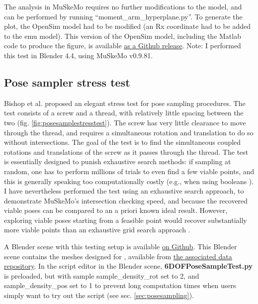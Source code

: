 \documentclass{article}
\begin{document}
The analysis in MuSkeMo requires no further modifications to the model, and can be performed by running ``moment\_arm\_hyperplane.py''. To generate the plot, the OpenSim model had to be modified (an Rx coordinate had to be added to the emu model). This version of the OpenSim model, including the Matlab code to produce the figure, is available \href{https://github.com/PashavanBijlert/MuSkeMo/releases/tag/v0.x-momentarmhyperplane}{as a Github release}. Note: I performed this test in Blender 4.4, using MuSkeMo v0.9.81.



\subsection{Pose sampler stress test}
\label{sec:posesampletest}

Bishop et al. \cite{bishopIntelligentSamplingHighdimensional2023} proposed an elegant stress test for pose sampling procedures. The test consists of a screw and a thread, with relatively little spacing between the two (fig. \ref{fig:posesamplestresstest}). The screw has very little clearance to move through the thread, and requires a simultaneous rotation and translation to do so without intersections. The goal of the test is to find the simultaneous coupled rotations and translations of the screw as it passes through the thread.
The test is essentially designed to punish exhaustive search methods: if sampling at random, one has to perform millions of trials to even find a few viable points, and this is generally speaking too computationally costly (e.g., when using booleans \cite{manafzadehROMMappingLigamentous2018,demuth3DHindlimbJoint2020,bishopIntelligentSamplingHighdimensional2023}). I have nevertheless performed the test using an exhaustive search approach, to demonstrate MuSkeMo's intersection checking speed, and because the recovered viable poses can be compared to an a priori known ideal result. However, exploring viable poses starting from a feasible point would recover substantially more viable points than an exhaustive grid search approach \cite{bishopIntelligentSamplingHighdimensional2023}. 

A Blender scene with this testing setup is available \href{https://github.com/PashavanBijlert/MuSkeMo/releases/tag/v0.x-posesamplestresstest}{on Github}. This Blender scene contains the meshes designed for \cite{bishopIntelligentSamplingHighdimensional2023}, available from \href{https://dataverse.harvard.edu/dataset.xhtml?persistentId=doi:10.7910/DVN/G0SHOQ}{the associated data repository}. In the script editor in the Blender scene, \textbf{6DOFPoseSampleTest.py} is preloaded, but with sample sample\_density\_rot set to 2, and sample\_density\_pos set to 1 to prevent long computation times when users simply want to try out the script (see sec. \ref{sec:posesampling}).
\end{document}
